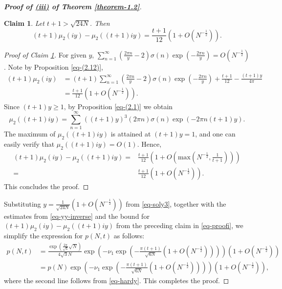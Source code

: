 \documentclass[11pt]{amsart}
\theoremstyle{plain}
\newtheorem{claim}[]{Claim}
\numberwithin{equation}{section}
\begin{document}
\begin{proof}[\textbf{\boldmath Proof of  \hyperlink{thm1.2iii}{{(iii)}} of Theorem \ref{theorem-1.2}}]
			\begin{claim}\label{claim-2}
				Let $t + 1 > \sqrt{24N}$. Then
				\begin{equation*}
					(t+1)\mu_{2}(iy)-\mu_{2}((t+1)iy)=\frac{t+1}{12}\left(1+O\left(N^{-\frac{1}{2}}\right)\right).
				\end{equation*}
			\end{claim}
			\medskip
			\begin{proof}[Proof of Claim \ref{claim-2}]
				For given $y$, $\sum_{n=1}^{\infty}\left(\frac{2\pi n}{y}-2\right)\sigma(n) \exp\left(-\frac{2\pi n}{y}\right)=O\left(N^{-\frac{1}{2}}\right)$. Note by 
				Proposition \ref{eq-(2.12)},
				\begin{align*}
					(t+1)\mu_{2}(iy)&=(t+1)\sum_{n=1}^{\infty}\left(\frac{2\pi n}{y}-2\right)\sigma(n) \exp\left(-\frac{2\pi n}{y}\right)+\frac{t+1}{12}-\frac{(t+1)y}{4\pi}\\
					&=\frac{t+1}{12}\left(1+O\left(N^{-\frac{1}{2}}\right)\right).
				\end{align*}
				Since $(t+1)y \ge 1$, by Proposition \ref{eq-(2.1)} we obtain
				\begin{equation*}
					\mu_{2}((t+1)iy) = \sum_{n=1}^{\infty}((t+1)y)^{3}(2\pi n)\sigma(n)\exp(-2\pi n(t+1)y).
				\end{equation*}
				The maximum of $\mu_2((t+1)iy)$ is attained at $(t+1)y = 1$, and one can easily verify that $\mu_{2}((t+1)iy)=O(1).$ Hence,
				\begin{align*}
					(t+1)\mu_{2}(iy)-\mu_{2}((t+1)iy)=&\frac{t+1}{12}\left(1+O\left(\text{max}\left(N^{-\frac{1}{2}}, \frac{1}{t+1}\right)\right)\right)\\
					=&\frac{t+1}{12}\left(1+O\left(N^{-\frac{1}{2}}\right)\right).
				\end{align*}
				This concludes the proof.
			\end{proof}
			Substituting $y = \frac{1}{\sqrt{24N}}\left(1+O\left(N^{-\frac{1}{2}}\right)\right)$ from \eqref{eq-soly3}, together with the estimates from \eqref{eq-yy-inverse} and the bound for $(t+1)\mu_{2}(iy)-\mu_{2}((t+1)iy)$ from the preceding claim in \eqref{eq-proofi}, we simplify the expression for $p(N,t)$ as follows:
			\begin{align*}
				p(N,t)&=\frac{\exp\left(\frac{2\pi}{\sqrt{6}}\sqrt{N}\right)}{4\sqrt{3}N}\exp\left(-\nu_1\exp\left(-\frac{\pi (t+1)}{\sqrt{6N}}\left(1+O\left(N^{-\frac{1}{2}}\right)\right)\right)\right)\left(1+O\left(N^{-\frac{1}{2}}\right)\right)\\
				&=p(N)\exp\left(-\nu_1\exp\left(-\frac{\pi (t+1)}{\sqrt{6N}}\left(1+O\left(N^{-\frac{1}{2}}\right)\right)\right)\right)\left(1+O\left(N^{-\frac{1}{2}}\right)\right),
			\end{align*}
			where the second line follows from \eqref{eq-hardy}.
			\newline
			This completes the proof.
		\end{proof}
		
\end{document}
